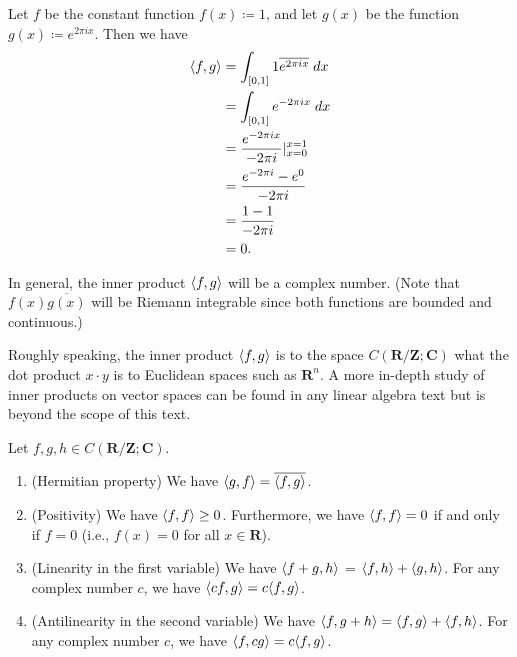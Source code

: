 \begin{example}\label{5.2.3}
    Let \(f\) be the constant function \(f(x) \coloneqq 1\), and let \(g(x)\) be the function \(g(x) \coloneqq e^{2 \pi i x}\).
    Then we have
    \begin{align*}
        \inner*{f, g} & = \int_{[0, 1]} 1 \overline{e^{2 \pi i x}} \; dx      \\
                      & = \int_{[0, 1]} e^{- 2 \pi i x} \; dx                 \\
                      & = \frac{e^{- 2 \pi i x}}{- 2 \pi i} |_{x = 0}^{x = 1} \\
                      & = \frac{e^{- 2 \pi i } - e^0}{- 2 \pi i}              \\
                      & = \frac{1 - 1}{- 2 \pi i}                             \\
                      & = 0.
    \end{align*}
\end{example}

\begin{remark}\label{5.2.4}
    In general, the inner product \(\inner*{f, g}\) will be a complex number.
    (Note that \(f(x) \overline{g(x)}\) will be Riemann integrable since both functions are bounded and continuous.)
\end{remark}

\begin{note}
    Roughly speaking, the inner product \(\inner*{f, g}\) is to the space \(C(\mathbf{R} / \mathbf{Z} ; \mathbf{C})\) what the dot product \(x \cdot y\) is to Euclidean spaces such as \(\mathbf{R}^n\).
    A more in-depth study of inner products on vector spaces can be found in any linear algebra text but is beyond the scope of this text.
\end{note}

\begin{lemma}\label{5.2.5}
    Let \(f, g, h \in C(\mathbf{R} / \mathbf{Z} ; \mathbf{C})\).
    \begin{enumerate}
        \item (Hermitian property)
              We have \(\inner*{g, f} = \overline{\inner*{f, g}}\).
        \item (Positivity)
              We have \(\inner*{f, f} \geq 0\).
              Furthermore, we have \(\inner*{f, f} = 0\) if and only if \(f = 0\)
              (i.e., \(f(x) = 0\) for all \(x \in \mathbf{R}\)).
        \item (Linearity in the first variable)
              We have \(\inner*{f +g, h}\) = \(\inner*{f, h} + \inner*{g, h}\).
              For any complex number \(c\), we have \(\inner*{cf, g} = c \inner*{f, g}\).
        \item (Antilinearity in the second variable)
              We have \(\inner*{f, g + h} = \inner*{f, g} + \inner*{f, h}\).
              For any complex number \(c\), we have \(\inner*{f, cg} = c \inner*{f, g}\).
    \end{enumerate}
\end{lemma}

